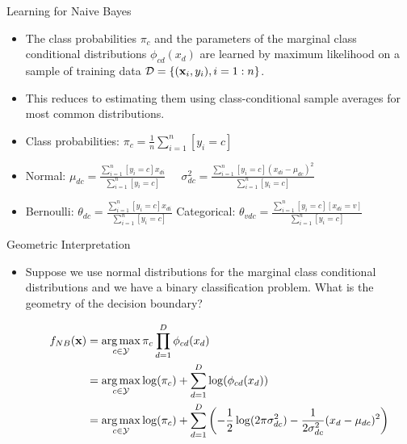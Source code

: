 \documentclass[serif,xcolor=pdftex,dvipsnames,table,hyperref={bookmarks=false}]{beamer}
\begin{document}
\begin{frame}[t]{Learning for Naive Bayes}

\begin{itemize}
\setlength{\itemsep}{12pt}
\item The class probabilities $\pi_c$ and the parameters of the marginal class conditional distributions $\phi_{cd}(x_d)$ are learned by maximum likelihood on a sample of training data $\mathcal{D}=\{({\mathbf{x}}_i,y_i),i=1:n\}$. 

\pause \item This reduces to estimating them using class-conditional sample averages for most common distributions.

\pause \item Class probabilities: $\displaystyle \pi_c = \frac{1}{n}\sum_{i=1}^n [y_i=c]$

\pause \item Normal: 
$\mu_{dc} = \frac{\sum_{i=1}^n [y_i=c]x_{di}}{\sum_{i=1}^n [y_i=c]}\;\;\;\;\;
\sigma^2_{dc} = \frac{\sum_{i=1}^n [y_i=c](x_{di}-\mu_{dc})^2}{\sum_{i=1}^n [y_i=c]}$

\pause \item Bernoulli: 
$\theta_{dc} = \frac{\sum_{i=1}^n [y_i=c]x_{di}}{\sum_{i=1}^n [y_i=c]}$ Categorical: 
$\theta_{vdc} = \frac{\sum_{i=1}^n [y_i=c][x_{di}=v]}{\sum_{i=1}^n [y_i=c]}$

\end{itemize}

\end{frame}


\begin{frame}[t]{Geometric Interpretation}

\begin{itemize}
\setlength{\itemsep}{12pt}
\item Suppose we use normal distributions for the marginal class conditional distributions and we have a binary classification problem. What is the geometry of the decision boundary?

\pause
\begin{align*}
f_{NB}({\mathbf{x}})&=\operatorname*{arg\,max}_{c\in\mathcal{Y}} \pi_c\prod_{d=1}^D\phi_{cd}(x_d)\\
               &=\operatorname*{arg\,max}_{c\in\mathcal{Y}} \log(\pi_c) + \sum_{d=1}^D\log(\phi_{cd}(x_d))\\
               &=\operatorname*{arg\,max}_{c\in\mathcal{Y}} \log(\pi_c) + \sum_{d=1}^D \left(-\frac{1}{2}\log(2\pi\sigma_{dc}^2) - \frac{1}{2\sigma_{dc}^2}(x_d-\mu_{dc})^2\right)
\end{align*}

\end{itemize}

\end{frame}
\end{document}

